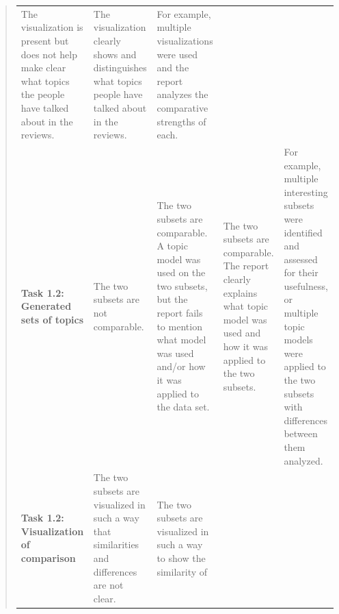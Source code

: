 \documentclass[11pt]{article}
\begin{document}
\begin{quote}
\begin{longtable}[]{@{}lllll@{}}
\begin{minipage}[t]{0.17\columnwidth}
The visualization is present but does not help make clear what topics
the people have talked about in the reviews.\strut
\end{minipage} & \begin{minipage}[t]{0.17\columnwidth}\raggedright
The visualization clearly shows and distinguishes what topics people
have talked about in the reviews.\strut
\end{minipage} & \begin{minipage}[t]{0.17\columnwidth}\raggedright
For example, multiple visualizations were used and the report analyzes
the comparative strengths of each.\strut
\end{minipage}\tabularnewline
\begin{minipage}[t]{0.17\columnwidth}\raggedright
\textbf{Task 1.2: Generated sets of topics}\strut
\end{minipage} & \begin{minipage}[t]{0.17\columnwidth}\raggedright
The two subsets are not comparable.\strut
\end{minipage} & \begin{minipage}[t]{0.17\columnwidth}\raggedright
The two subsets are comparable. A topic model was used on the two
subsets, but the report fails to mention what model was used and/or how
it was applied to the data set.\strut
\end{minipage} & \begin{minipage}[t]{0.17\columnwidth}\raggedright
The two subsets are comparable. The report clearly explains what topic
model was used and how it was applied to the two subsets.\strut
\end{minipage} & \begin{minipage}[t]{0.17\columnwidth}\raggedright
For example, multiple interesting subsets were identified and assessed
for their usefulness, or multiple topic models were applied to the two
subsets with differences between them analyzed.\strut
\end{minipage}\tabularnewline
\begin{minipage}[t]{0.17\columnwidth}\raggedright
\textbf{Task 1.2: Visualization of comparison}\strut
\end{minipage} & \begin{minipage}[t]{0.17\columnwidth}\raggedright
The two subsets are visualized in such a way that similarities and
differences are not clear.\strut
\end{minipage} & \begin{minipage}[t]{0.17\columnwidth}\raggedright
The two subsets are visualized in such a way to show the similarity of

\end{minipage}
\end{longtable}
\end{quote}
\end{document}
